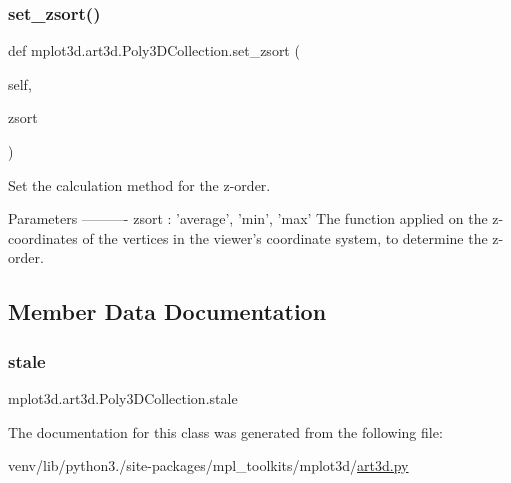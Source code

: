 \subsubsection{\texorpdfstring{set\+\_\+zsort()}{set\_zsort()}}
{\footnotesize\ttfamily def mplot3d.\+art3d.\+Poly3\+D\+Collection.\+set\+\_\+zsort (\begin{DoxyParamCaption}\item[{}]{self,  }\item[{}]{zsort }\end{DoxyParamCaption})}

\begin{DoxyVerb}Set the calculation method for the z-order.

Parameters
----------
zsort : {'average', 'min', 'max'}
    The function applied on the z-coordinates of the vertices in the
    viewer's coordinate system, to determine the z-order.
\end{DoxyVerb}
 

\subsection{Member Data Documentation}
\mbox{\label{classmplot3d_1_1art3d_1_1Poly3DCollection_aa3b22f8300418e7eac479beef44f41c9}} 
\subsubsection{\texorpdfstring{stale}{stale}}
{\footnotesize\ttfamily mplot3d.\+art3d.\+Poly3\+D\+Collection.\+stale}



The documentation for this class was generated from the following file\+:\begin{DoxyCompactItemize}
\item 
venv/lib/python3./site-\/packages/mpl\+\_\+toolkits/mplot3d/\hyperlink{art3d_8py}{art3d.\+py}\end{DoxyCompactItemize}
